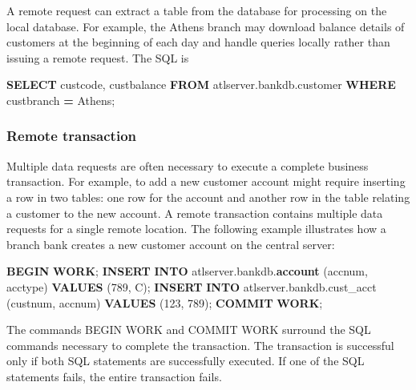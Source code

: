 \documentclass[
]{article}
\newenvironment{Shaded}{\begin{snugshade}}{\end{snugshade}}
\newcommand{\ControlFlowTok}[1]{\textcolor[rgb]{0.13,0.29,0.53}{\textbf{#1}}}
\newcommand{\DecValTok}[1]{\textcolor[rgb]{0.00,0.00,0.81}{#1}}
\newcommand{\KeywordTok}[1]{\textcolor[rgb]{0.13,0.29,0.53}{\textbf{#1}}}
\newcommand{\NormalTok}[1]{#1}
\newcommand{\OperatorTok}[1]{\textcolor[rgb]{0.81,0.36,0.00}{\textbf{#1}}}
\newcommand{\StringTok}[1]{\textcolor[rgb]{0.31,0.60,0.02}{#1}}
\begin{document}
A remote request can extract a table from the database for processing on
the local database. For example, the Athens branch may download balance
details of customers at the beginning of each day and handle queries
locally rather than issuing a remote request. The SQL is

\begin{Shaded}
\begin{Highlighting}[]
\KeywordTok{SELECT}\NormalTok{ custcode, custbalance }\KeywordTok{FROM}\NormalTok{ atlserver.bankdb.customer}
    \KeywordTok{WHERE}\NormalTok{ custbranch }\OperatorTok{=} \StringTok{\textquotesingle{}Athens\textquotesingle{}}\NormalTok{;}
\end{Highlighting}
\end{Shaded}

\hypertarget{remote-transaction}{%
\subsubsection*{Remote transaction}\label{remote-transaction}}

Multiple data requests are often necessary to execute a complete
business transaction. For example, to add a new customer account might
require inserting a row in two tables: one row for the account and
another row in the table relating a customer to the new account. A
remote transaction contains multiple data requests for a single remote
location. The following example illustrates how a branch bank creates a
new customer account on the central server:

\begin{Shaded}
\begin{Highlighting}[]
\ControlFlowTok{BEGIN} \KeywordTok{WORK}\NormalTok{;}
\KeywordTok{INSERT} \KeywordTok{INTO}\NormalTok{ atlserver.bankdb.}\KeywordTok{account}
\NormalTok{    (accnum, acctype)}
    \KeywordTok{VALUES}\NormalTok{ (}\DecValTok{789}\NormalTok{, }\StringTok{\textquotesingle{}C\textquotesingle{}}\NormalTok{);}
\KeywordTok{INSERT} \KeywordTok{INTO}\NormalTok{ atlserver.bankdb.cust\_acct}
\NormalTok{    (custnum, accnum)}
    \KeywordTok{VALUES}\NormalTok{ (}\DecValTok{123}\NormalTok{, }\DecValTok{789}\NormalTok{);}
\KeywordTok{COMMIT} \KeywordTok{WORK}\NormalTok{;}
\end{Highlighting}
\end{Shaded}

The commands BEGIN WORK and COMMIT WORK surround the SQL commands
necessary to complete the transaction. The transaction is successful
only if both SQL statements are successfully executed. If one of the SQL
statements fails, the entire transaction fails.
\end{document}
